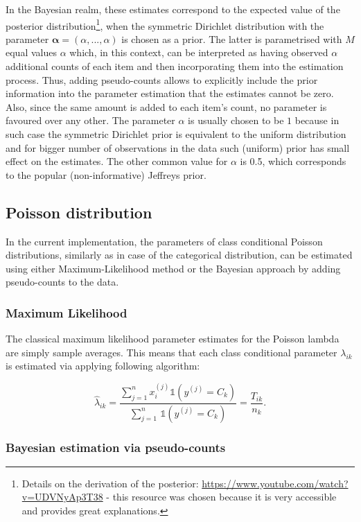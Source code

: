\documentclass{article}\usepackage[]{graphicx}\usepackage[]{color}
\begin{document}
In the Bayesian realm, these estimates correspond to the expected value of the posterior distribution\footnote{Details on the derivation of the posterior: \url{https://www.youtube.com/watch?v=UDVNyAp3T38} - this resource was chosen because it is very accessible and provides great explanations.}, when the symmetric Dirichlet distribution with the parameter $\boldsymbol{\alpha} = (\alpha,...,\alpha)$ is chosen as a prior. The latter is parametrised with $M$ equal values $\alpha$ which, in this context, can be interpreted as having observed $\alpha$ additional counts of each item and then incorporating them into the estimation process. Thus, adding pseudo-counts allows to explicitly include the prior information into the parameter estimation that the estimates cannot be zero. Also, since the same amount is added to each item's count, no parameter is favoured over any other. The parameter $\alpha$ is usually chosen to be $1$ because in such case the symmetric Dirichlet prior is equivalent to the uniform distribution and for bigger number of observations in the data such (uniform) prior has small effect on the estimates. The other common value for $\alpha$ is 0.5, which corresponds to the popular (non-informative) Jeffreys prior.


\subsection{Poisson distribution}

In the current implementation, the parameters of class conditional Poisson distributions, similarly as in case of the categorical distribution, can be estimated using either Maximum-Likelihood method or the Bayesian approach by adding pseudo-counts to the data.


\subsubsection{Maximum Likelihood}

The classical maximum likelihood parameter estimates for the Poisson lambda are simply sample averages. This means that each class conditional parameter $\lambda_{ik}$ is estimated via applying following algorithm:

$$\hat{\lambda}_{ik} = \frac{\sum_{j=1}^n x_i^{(j)} \mathbb{1}(y^{(j)} = C_k) }{\sum_{j=1}^n \, \mathbb{1}(y^{(j)} = C_k)} = \frac{T_{ik}}{n_k}.$$


\subsubsection{Bayesian estimation via pseudo-counts}
\end{document}

